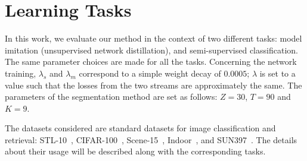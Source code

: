 \documentclass{bmvc2k}
\begin{document}


\section{Learning Tasks} 
\label{sec:tasks}


In this work, we evaluate our method in the context of two
different tasks: model imitation (unsupervised network distillation), and semi-supervised classification. The same parameter
choices are made for all the tasks. Concerning the network training,
$\lambda_s$ and $\lambda_m$ correspond to a simple weight decay of $0.0005$;
$\lambda$ is set to a value such that the losses from the two
streams are approximately the same. The parameters of the segmentation
method are set as follows: $Z=30$, $T=90$ and $K=9$. 

The datasets considered are standard datasets for image classification
and retrieval: 
STL-10~\cite{stl-10},  CIFAR-100~\cite{cifar}, Scene-15~\cite{lazebnik:cvpr06}, Indoor~\cite{Indoor}, and SUN397~\cite{SUN397}. The details about
their usage will be described along with the corresponding tasks.

\end{document}
